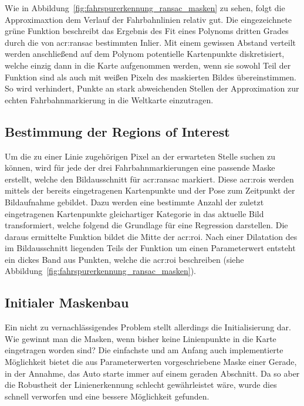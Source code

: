 Wie in Abbildung~\ref{fig:fahrspurerkennung_ransac_masken} zu sehen, folgt die Approximaxtion dem Verlauf der Fahrbahnlinien relativ gut. Die eingezeichnete grüne Funktion beschreibt das Ergebnis des Fit eines Polynoms dritten Grades durch die von \gls{acr:ransac} bestimmten Inlier. Mit einem gewissen Abstand verteilt werden anschließend auf dem Polynom potentielle Kartenpunkte diskretisiert, welche einzig dann in die Karte aufgenommen werden, wenn sie sowohl Teil der Funktion sind als auch mit weißen Pixeln des maskierten Bildes übereinstimmen. So wird verhindert, Punkte an stark abweichenden Stellen der Approximation zur echten Fahrbahnmarkierung in die Weltkarte einzutragen. 


\subsection{Bestimmung der \glqq Regions of Interest\grqq{}}

Um die zu einer Linie zugehörigen Pixel an der erwarteten Stelle suchen zu können, wird für jede der drei Fahrbahnmarkierungen eine passende Maske erstellt, welche den Bildausschnitt für \gls{acr:ransac} markiert. Diese \glspl{acr:roi} werden mittels der bereits eingetragenen Kartenpunkte und der Pose zum Zeitpunkt der Bildaufnahme gebildet.  
Dazu werden eine bestimmte Anzahl der zuletzt eingetragenen Kartenpunkte gleichartiger Kategorie in das aktuelle Bild transformiert, welche folgend die Grundlage für eine Regression darstellen. Die daraus ermittelte Funktion bildet die Mitte der \gls{acr:roi}. Nach einer Dilatation des im Bildausschnitt liegenden Teils der Funktion um einen Parameterwert entsteht ein dickes Band aus Punkten, welche die \gls{acr:roi} beschreiben (siehe Abbildung~\ref{fig:fahrspurerkennung_ransac_masken}).

\subsection{Initialer Maskenbau} 
\label{par:maskenbau:initial}

Ein nicht zu vernachlässigendes Problem stellt allerdings die Initialisierung dar. Wie gewinnt man die Masken, wenn bisher keine Linienpunkte in die Karte eingetragen worden sind? Die einfachste und am Anfang auch implementierte Möglichkeit bietet die aus Parameterwerten vorgeschriebene Maske einer Gerade, in der Annahme, das Auto starte immer auf einem geraden Abschnitt. Da so aber die Robustheit der Linienerkennung schlecht gewährleistet wäre, wurde dies schnell verworfen und eine bessere Möglichkeit gefunden. 

